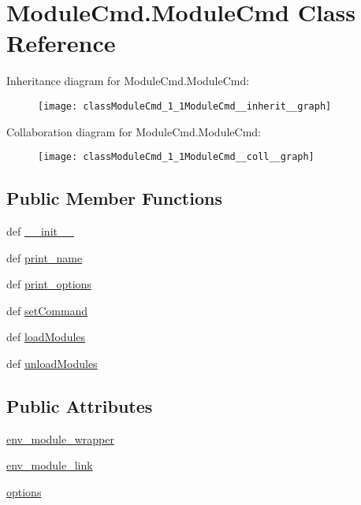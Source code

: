 \hypertarget{classModuleCmd_1_1ModuleCmd}{\section{Module\-Cmd.\-Module\-Cmd Class Reference}
\label{classModuleCmd_1_1ModuleCmd}
}


Inheritance diagram for Module\-Cmd.\-Module\-Cmd\-:\nopagebreak
\begin{figure}[H]
\begin{center}
\leavevmode
\texttt{[image: classModuleCmd\_1\_1ModuleCmd\_\_inherit\_\_graph]}
\end{center}
\end{figure}


Collaboration diagram for Module\-Cmd.\-Module\-Cmd\-:\nopagebreak
\begin{figure}[H]
\begin{center}
\leavevmode
\texttt{[image: classModuleCmd\_1\_1ModuleCmd\_\_coll\_\_graph]}
\end{center}
\end{figure}
\subsection*{Public Member Functions}
\begin{DoxyCompactItemize}
\item 
def \hyperlink{classModuleCmd_1_1ModuleCmd_afc2639b024f0254c9a1e4db7c0e890cf}{\-\_\-\-\_\-init\-\_\-\-\_\-}
\item 
def \hyperlink{classModuleCmd_1_1ModuleCmd_ae44917ee5bdcc85a4b1675f82a2f03b3}{print\-\_\-name}
\item 
def \hyperlink{classModuleCmd_1_1ModuleCmd_a731bb50ac44c88e49675b9790740a9af}{print\-\_\-options}
\item 
def \hyperlink{classModuleCmd_1_1ModuleCmd_aafcfb3f7b8d445df29c888c938c932fd}{set\-Command}
\item 
def \hyperlink{classModuleCmd_1_1ModuleCmd_acb50720c70196a40e3bde85f79fea3cb}{load\-Modules}
\item 
def \hyperlink{classModuleCmd_1_1ModuleCmd_a93a6a59db499c50ffb9ffe8e043a4733}{unload\-Modules}
\end{DoxyCompactItemize}
\subsection*{Public Attributes}
\begin{DoxyCompactItemize}
\item 
\hyperlink{classModuleCmd_1_1ModuleCmd_ae60edec82191b5a7a1830495b1ca2e3e}{env\-\_\-module\-\_\-wrapper}
\item 
\hyperlink{classModuleCmd_1_1ModuleCmd_a1b4a34e278600fe59cd55bb0d56baa61}{env\-\_\-module\-\_\-link}
\item 
\hyperlink{classModuleCmd_1_1ModuleCmd_a981a0fc879a722b76faa16b4289ab953}{options}
\end{DoxyCompactItemize}


